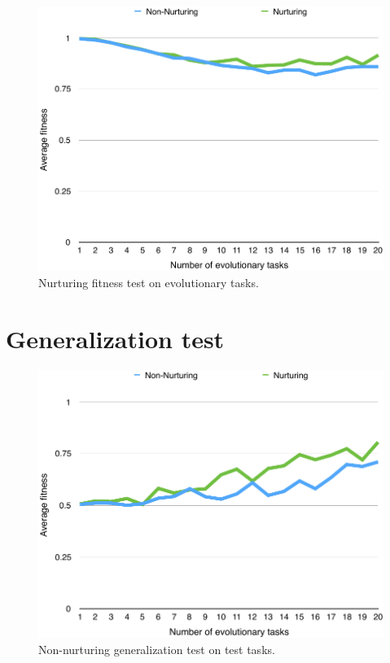 \documentclass[master]{outhesis}
\begin{document}
\begin{figure}[H]
	\centering
	\includegraphics{NurturingFitnessTestPlot.pdf}
	\caption{Nurturing fitness test on evolutionary tasks.}
\end{figure}

\section{Generalization test}

\begin{figure}[H]
	\centering
	\includegraphics{NonNurturingGeneralizationTestPlot.pdf}
	\caption{Non-nurturing generalization test on test tasks.}
\end{figure}
\end{document}
